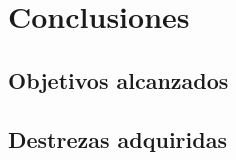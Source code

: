 \chapter{Conclusiones}
\label{chap:conclusiones}


\section{Objetivos alcanzados}

\section{Destrezas adquiridas}
